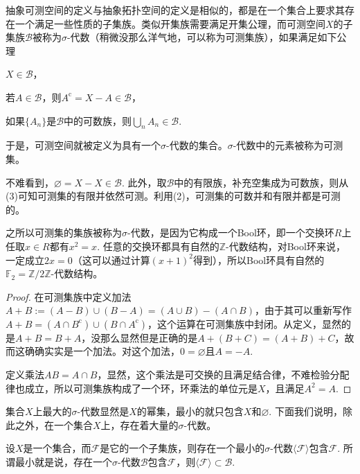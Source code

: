\begin{para}
抽象可测空间的定义与抽象拓扑空间的定义是相似的，都是在一个集合上要求其存在一个满足一些性质的子集族。类似开集族需要满足开集公理，而可测空间$X$的子集族$\mathcal{B}$被称为$\sigma$-代数（稍微没那么洋气地，可以称为可测集族），如果满足如下公理
\begin{compactenum}[~~~~(1)]
\item $X\in \mathcal{B}$，
\item 若$A\in \mathcal{B}$，则$A^\text{c}=X-A\in \mathcal{B}$，
\item 如果$\{A_n\}$是$\mathcal{B}$中的可数族，则$\bigcup_n A_n\in \mathcal{B}$.
\end{compactenum}
于是，可测空间就被定义为具有一个$\sigma$-代数的集合。$\sigma$-代数中的元素被称为可测集。

不难看到，$\varnothing=X-X\in \mathcal{B}$. 此外，取$\mathcal{B}$中的有限族，补充空集成为可数族，则从(3)可知可测集的有限并依然可测。利用(2)，可测集的可数并和有限并都是可测的。

之所以可测集的集族被称为$\sigma$-代数，是因为它构成一个Bool环，即一个交换环$R$上任取$x\in R$都有$x^2=x$. 任意的交换环都具有自然的$\mathbb{Z}$-代数结构，对Bool环来说，一定成立$2x=0$（这可以通过计算$(x+1)^2$得到），所以Bool环具有自然的$\mathbb{F}_2=\mathbb{Z}/2\mathbb{Z}$-代数结构。

\begin{proof}
在可测集族中定义加法$A+B:=(A-B)\cup (B-A)=(A\cup B)-(A\cap B)$，由于其可以重新写作$A+B=(A\cap B^\text{c})\cup (B\cap A^\text{c})$，这个运算在可测集族中封闭。从定义，显然的是$A+B=B+A$，没那么显然但是正确的是$A+(B+C)=(A+B)+C$，故而这确确实实是一个加法。对这个加法，$0=\varnothing$且$A=-A$. 

定义乘法$AB=A\cap B$，显然，这个乘法是可交换的且满足结合律，不难检验分配律也成立，所以可测集族构成了一个环，环乘法的单位元是$X$，且满足$A^2=A$.
\end{proof}

集合$X$上最大的$\sigma$-代数显然是$X$的幂集，最小的就只包含$X$和$\varnothing$. 下面我们说明，除此之外，在一个集合$X$上，存在着大量的$\sigma$-代数。
\end{para}

\begin{pro}
设$X$是一个集合，而$\mathcal{F}$是它的一个子集族，则存在一个最小的$\sigma$-代数$\langle \mathcal{F}\rangle$包含$\mathcal{F}$. 所谓最小就是说，存在一个$\sigma$-代数$\mathcal{B}$包含$\mathcal{F}$，则$\langle \mathcal{F}\rangle\subset \mathcal{B}$.
\end{pro}

